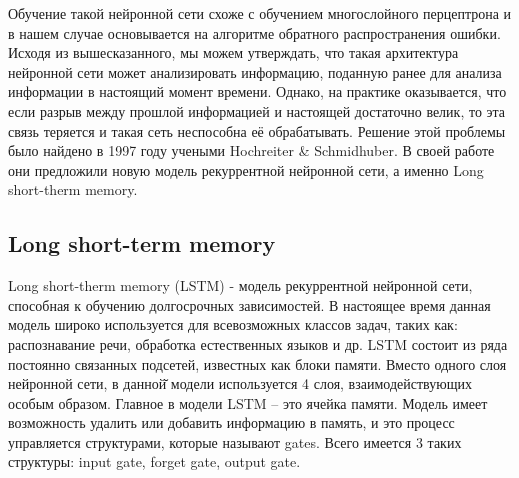     Обучение такой нейронной сети схоже с обучением многослойного перцептрона и в нашем случае основывается на алгоритме обратного распространения ошибки. Исходя из вышесказанного, мы можем утверждать, что такая архитектура нейронной сети может анализировать информацию, поданную ранее для анализа информации в настоящий момент времени. Однако, на практике оказывается, что если разрыв между прошлой информацией и настоящей достаточно велик, то эта связь теряется и такая сеть неспособна её обрабатывать. Решение этой проблемы было найдено в 1997 году учеными Hochreiter & Schmidhuber. В своей работе они предложили новую модель рекуррентной нейронной сети, а именно Long short-therm memory.
    \subsection{Long short-term memory}
    Long short-therm memory (LSTM) - модель рекуррентной нейронной сети, способная к обучению долгосрочных зависимостей. В настоящее время данная модель широко используется для всевозможных классов задач, таких как: распознавание речи, обработка естественных языков и др. LSTM состоит из ряда постоянно связанных подсетей, известных как блоки памяти. Вместо одного слоя нейронной сети, в данной̆ модели используется 4 слоя, взаимодействующих особым образом. Главное в модели LSTM – это ячейка памяти. Модель имеет возможность удалить или добавить информацию в память, и это процесс управляется структурами, которые называют gates. Всего имеется 3 таких структуры: input gate, forget gate, output gate.
    
